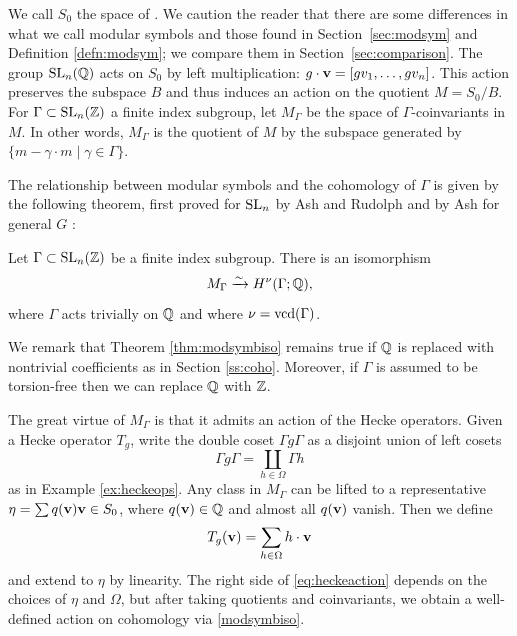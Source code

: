 We call $S_{0}$ the space of .  We caution the
reader that there are some differences in what we call modular symbols
and those found in Section~\ref{sec:modsym} and Definition
\ref{defn:modsym}; we compare them in 
Section~\ref{sec:comparison}.  The group $\operatorname{SL}_{n} (\mathbb{Q})$ acts on $S_{0}$ by
left multiplication: $g\cdot {\mathbf {v}} = [gv_{1},\dotsc ,gv_{n}]$.  This
action preserves the subspace $B$ and thus induces an action on the
quotient $M = S_{0}/B$.  For $\Gamma \subset \operatorname{SL}_{n} (\mathbb{Z})$ a finite
index subgroup, let $M_{\Gamma}$ be the space of $\Gamma$-coinvariants
in $M$.  In other words, $M_{\Gamma}$ is the quotient of $M$ by the
subspace generated by $\{ m - \gamma \cdot m \mid \gamma \in
\Gamma\}$.

The relationship between modular symbols and the cohomology of
$\Gamma$ is given by the following theorem, first proved for $\operatorname{SL}_{n}$
by Ash and Rudolph \cite{ash.rudolph} and by Ash for general $G$
\cite{ash.minmod}:

\begin{theorem}\label{thm:modsymbiso}
 Let $\Gamma \subset \operatorname{SL}_{n} (\mathbb{Z})$ be a
finite index subgroup.  There is an isomorphism
\begin{equation}\label{modsymbiso}
M_{\Gamma}\xrightarrow{\sim} H^{\nu} (\Gamma ; \mathbb{Q}),
\end{equation}
where $\Gamma$ acts trivially on $\mathbb{Q}$ and where $\nu = \operatorname{vcd} (\Gamma )$.
\end{theorem}

We remark that Theorem \ref{thm:modsymbiso} remains true if $\mathbb{Q}$ is
replaced with nontrivial coefficients as in Section \ref{ss:coho}.
Moreover, if $\Gamma$ is assumed to be torsion-free then we can
replace $\mathbb{Q}$ with $\mathbb{Z}$.


The great virtue of $M_{\Gamma}$ is that it admits an action of the
Hecke operators.  Given a Hecke operator $T_{g}$, write 
the double coset $\Gamma g\Gamma$ as a disjoint union of left cosets
\begin{equation}\label{eq:coset.decomp}
\Gamma g\Gamma  = \coprod_{h\in \Omega} \Gamma h
\end{equation}
as in Example \ref{ex:heckeops}.  
Any class in $M_{\Gamma}$ can be lifted to a representative $\eta =
\sum q ({\mathbf {v}}){\mathbf {v}} \in S_0$, where $q ({\mathbf {v}})\in \mathbb{Q}$
and almost all $q ({\mathbf {v}})$ vanish.  
Then we define
\begin{equation}\label{eq:heckeaction}
T_{g} ({\mathbf {v}}) = \sum_{h\in \Omega} h\cdot {\mathbf {v}}
\end{equation}
and extend to $\eta$ by linearity.  The right side of
\eqref{eq:heckeaction} depends on the choices of $\eta$ and $\Omega$,
but after taking quotients and coinvariants, we obtain a well-defined
action on cohomology via \eqref{modsymbiso}.

